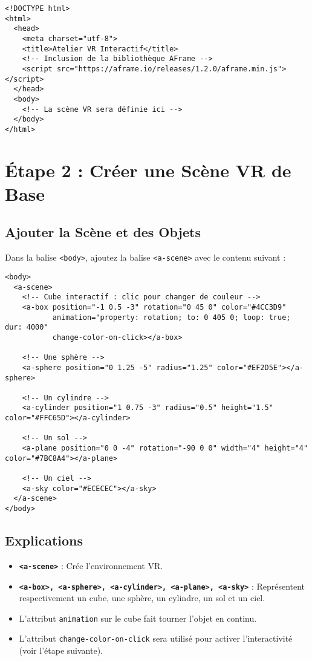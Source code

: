 \documentclass[12pt]{article}
\begin{document}
\begin{verbatim}
<!DOCTYPE html>
<html>
  <head>
    <meta charset="utf-8">
    <title>Atelier VR Interactif</title>
    <!-- Inclusion de la bibliothèque AFrame -->
    <script src="https://aframe.io/releases/1.2.0/aframe.min.js"></script>
  </head>
  <body>
    <!-- La scène VR sera définie ici -->
  </body>
</html>
\end{verbatim}

\section{Étape 2 : Créer une Scène VR de Base}
\subsection{Ajouter la Scène et des Objets}
Dans la balise \texttt{<body>}, ajoutez la balise \texttt{<a-scene>} avec le contenu suivant :

\begin{verbatim}
<body>
  <a-scene>
    <!-- Cube interactif : clic pour changer de couleur -->
    <a-box position="-1 0.5 -3" rotation="0 45 0" color="#4CC3D9"
           animation="property: rotation; to: 0 405 0; loop: true; dur: 4000"
           change-color-on-click></a-box>
    
    <!-- Une sphère -->
    <a-sphere position="0 1.25 -5" radius="1.25" color="#EF2D5E"></a-sphere>
    
    <!-- Un cylindre -->
    <a-cylinder position="1 0.75 -3" radius="0.5" height="1.5" color="#FFC65D"></a-cylinder>
    
    <!-- Un sol -->
    <a-plane position="0 0 -4" rotation="-90 0 0" width="4" height="4" color="#7BC8A4"></a-plane>
    
    <!-- Un ciel -->
    <a-sky color="#ECECEC"></a-sky>
  </a-scene>
</body>
\end{verbatim}

\subsection{Explications}
\begin{itemize}
    \item \textbf{\texttt{<a-scene>}} : Crée l'environnement VR.
    \item \textbf{\texttt{<a-box>, <a-sphere>, <a-cylinder>, <a-plane>, <a-sky>}} : Représentent respectivement un cube, une sphère, un cylindre, un sol et un ciel.
    \item L'attribut \texttt{animation} sur le cube fait tourner l'objet en continu.
    \item L'attribut \texttt{change-color-on-click} sera utilisé pour activer l'interactivité (voir l'étape suivante).
\end{itemize}
\end{document}
